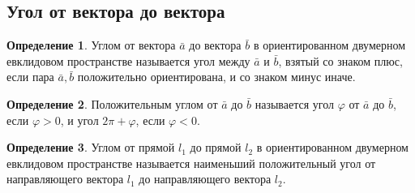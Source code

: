 \documentclass[a4paper, 12pt]{article}
\renewcommand{\phi}{\varphi}
\theoremstyle{definition}
\newtheorem*{definition}{Определение}
\begin{document}
	\subsection{Угол от вектора до вектора}
	\begin{definition}
		Углом от вектора $\bar{a}$ до вектора $\bar{b}$ в ориентированном двумерном евклидовом пространстве называется угол между $\bar{a}$ и $\bar{b}$, взятый со знаком плюс, если пара $\bar{a}, \bar{b}$ положительно ориентирована, и со знаком минус иначе.
	\end{definition}
	\begin{definition}
		Положительным углом от $\bar{a}$ до $\bar{b}$ называется угол $\phi$ от $\bar{a}$ до $\bar{b}$, если $\phi > 0$, и угол $2\pi + \phi$, если $\phi < 0$.
	\end{definition}
	\begin{definition}
		Углом от прямой $l_{1}$ до прямой $l_{2}$ в ориентированном двумерном евклидовом пространстве называется наименьший положительный угол от направляющего вектора $l_{1}$ до направляющего вектора $l_{2}$.
	\end{definition}
\end{document}
